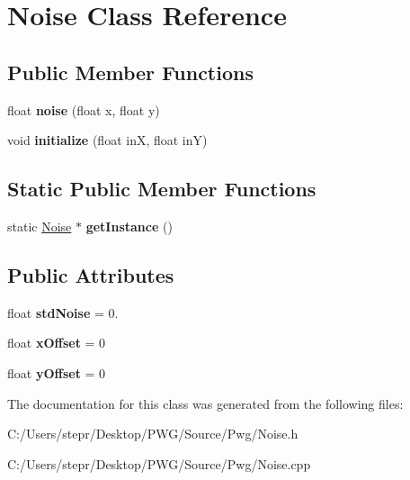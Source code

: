 \hypertarget{class_noise}{}\section{Noise Class Reference}
\label{class_noise}
\subsection*{Public Member Functions}
\begin{DoxyCompactItemize}
\item 
\mbox{\label{class_noise_a3cf6824c29b66b20d964d49eb090f158}} 
float {\bfseries noise} (float x, float y)
\item 
\mbox{\label{class_noise_a20f8ce328d1cc9b6d50b709e519c9e29}} 
void {\bfseries initialize} (float inX, float inY)
\end{DoxyCompactItemize}
\subsection*{Static Public Member Functions}
\begin{DoxyCompactItemize}
\item 
\mbox{\label{class_noise_a6a3d743b7197891529c381cbc7b76cbb}} 
static \mbox{\hyperlink{class_noise}{Noise}} $\ast$ {\bfseries get\+Instance} ()
\end{DoxyCompactItemize}
\subsection*{Public Attributes}
\begin{DoxyCompactItemize}
\item 
\mbox{\label{class_noise_a4d63b6963785b035699c49683d14a208}} 
float {\bfseries std\+Noise} = 0.
\item 
\mbox{\label{class_noise_a2f944eb642bf6f842fab0a6db32132e3}} 
float {\bfseries x\+Offset} = 0
\item 
\mbox{\label{class_noise_af4492988a8ee13d50caf036ab3340a77}} 
float {\bfseries y\+Offset} = 0
\end{DoxyCompactItemize}


The documentation for this class was generated from the following files\+:\begin{DoxyCompactItemize}
\item 
C\+:/\+Users/stepr/\+Desktop/\+P\+W\+G/\+Source/\+Pwg/Noise.\+h\item 
C\+:/\+Users/stepr/\+Desktop/\+P\+W\+G/\+Source/\+Pwg/Noise.\+cpp\end{DoxyCompactItemize}

